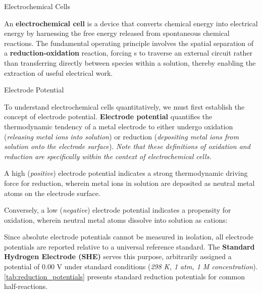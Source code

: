 \documentclass[10pt]{article}
\begin{document}
  \begin{core}[label=core:electrochemical_cells]{Electrochemical Cells}

      An \textbf{electrochemical cell} is a device that converts chemical energy into electrical energy by harnessing the free energy released from spontaneous chemical reactions. The fundamental operating principle involves the spatial separation of a \textbf{reduction-oxidation} reaction, forcing s to traverse an external circuit rather than transferring directly between species within a solution, thereby enabling the extraction of useful electrical work.

    \end{core}

    \begin{core}{Electrode Potential}

      To understand electrochemical cells quantitatively, we must first establish the concept of electrode potential. \textbf{Electrode potential} quantifies the thermodynamic tendency of a metal electrode to either undergo oxidation (\textit{releasing metal ions into solution}) or reduction (\textit{depositing metal ions from solution onto the electrode surface}). \textit{Note that these definitions of oxidation and reduction are specifically within the context of electrochemical cells.}

      A high (\textit{positive}) electrode potential indicates a strong thermodynamic driving force for reduction, wherein metal ions in solution are deposited as neutral metal atoms on the electrode surface.


      Conversely, a low (\textit{negative}) electrode potential indicates a propensity for oxidation, wherein neutral metal atoms dissolve into solution as cations:


      Since absolute electrode potentials cannot be measured in isolation, all electrode potentials are reported relative to a universal reference standard. The \textbf{Standard Hydrogen Electrode (SHE)} serves this purpose, arbitrarily assigned a potential of 0.00 V under standard conditions (\textit{298 K, 1 atm, 1 M concentration}). \autoref{tab:reduction_potentials} presents standard reduction potentials for common half-reactions.


\end{core}
\end{document}
